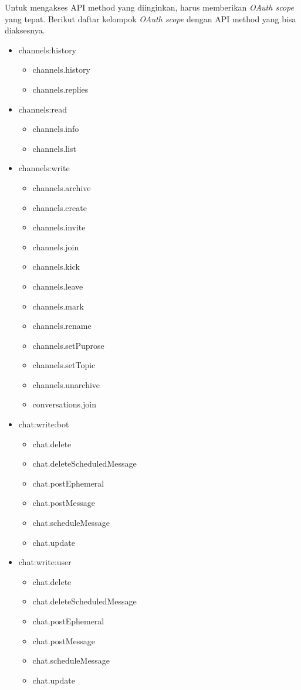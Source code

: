 Untuk mengakses API method yang diinginkan, harus memberikan \textit{OAuth scope} yang tepat. Berikut daftar kelompok \textit{OAuth scope} dengan API method yang bisa diaksesnya. 
\begin{multicols}{2}
\begin{itemize}
	\item channels:history
	\begin{itemize}
		\item channels.history
		\item channels.replies
	\end{itemize}
	
	\item channels:read
	\begin{itemize}
		\item channels.info
		\item channels.list
	\end{itemize}
	
	\item channels:write
	\begin{itemize}
		\item channels.archive
		\item channels.create
		\item channels.invite
		\item channels.join
		\item channels.kick
		\item channels.leave
		\item channels.mark
		\item channels.rename
		\item channels.setPuprose
		\item channels.setTopic
		\item channels.unarchive
		\item conversations.join
	\end{itemize}
	
	\item chat:write:bot
	\begin{itemize}
		\item chat.delete
		\item chat.deleteScheduledMessage
		\item chat.postEphemeral
		\item chat.postMessage
		\item chat.scheduleMessage
		\item chat.update
	\end{itemize}
	
	\item chat:write:user
	\begin{itemize}
		\item chat.delete
		\item chat.deleteScheduledMessage
		\item chat.postEphemeral
		\item chat.postMessage
		\item chat.scheduleMessage
		\item chat.update
	\end{itemize}
	

\end{itemize}
\end{multicols}
